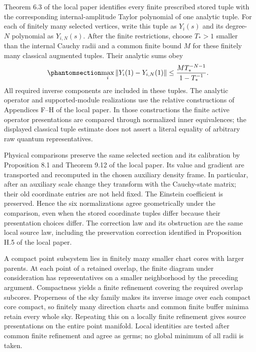 \documentclass[
  english,
  11pt,
  reqno]{amsart}
\begin{document}
Theorem 6.3 of the local paper identifies every finite prescribed stored
tuple with the corresponding internal-amplitude Taylor polynomial of one
analytic tuple. For each of finitely many selected vertices, write this
tuple as \(Y_i(s)\) and its degree-\(N\) polynomial as \(Y_{i,N}(s)\).
After the finite restrictions, choose \(T_*>1\) smaller than the
internal Cauchy radii and a common finite bound \(M\) for these finitely
many classical augmented tuples. Their analytic sums obey
\begin{equation}\protect\phantomsection\label{eq:finite-source-atlas-classical-tail}{
\max_i\|Y_i(1)-Y_{i,N}(1)\|
\le
\frac{M T_*^{-N-1}}{1-T_*^{-1}}.
}\end{equation} All required inverse components are included in these
tuples. The analytic operator and supported-module realizations use the
relative constructions of Appendices F--H of the local paper. In those
constructions the finite active operator presentations are compared
through normalized inner equivalences; the displayed classical tuple
estimate does not assert a literal equality of arbitrary raw quantum
representatives.

Physical comparisons preserve the same selected section and its
calibration by Proposition 8.1 and Theorem 9.12 of the local paper. Its
value and gradient are transported and recomputed in the chosen
auxiliary density frame. In particular, after an auxiliary scale change
they transform with the Cauchy-state matrix; their old coordinate
entries are not held fixed. The Einstein coefficient is preserved. Hence
the six normalizations agree geometrically under the comparison, even
when the stored coordinate tuples differ because their presentation
choices differ. The correction law and its obstruction are the same
local source law, including the preservation correction identified in
Proposition H.5 of the local paper.

A compact point subsystem lies in finitely many smaller chart cores with
larger parents. At each point of a retained overlap, the finite diagram
under consideration has representatives on a smaller neighborhood by the
preceding argument. Compactness yields a finite refinement covering the
required overlap subcores. Properness of the sky family makes its
inverse image over each compact core compact, so finitely many direction
charts and common finite buffer minima retain every whole sky. Repeating
this on a locally finite refinement gives source presentations on the
entire point manifold. Local identities are tested after common finite
refinement and agree as germs; no global minimum of all radii is taken.
\end{document}
